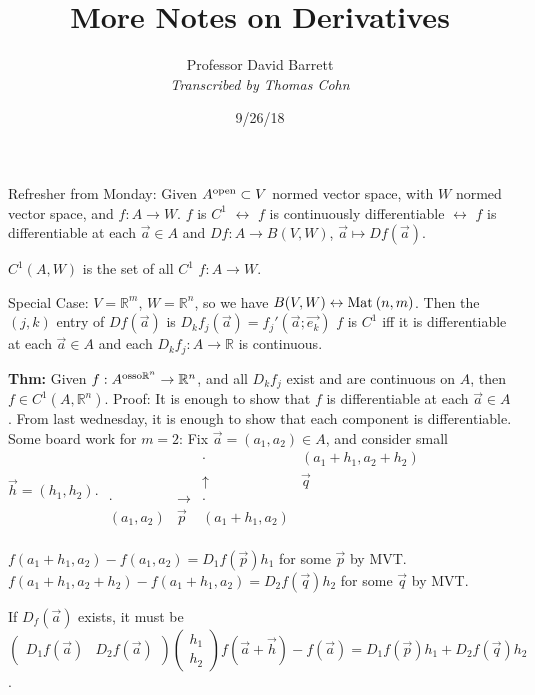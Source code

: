 \documentclass[10pt,letterpaper]{article}
\author{Professor David Barrett\\ \small\textit{Transcribed by Thomas Cohn}}
\title{More Notes on Derivatives}
\date{9/26/18} %
\newcommand{\n}{\hfill\break}
\newcommand{\thm}[1]{\par\noindent\settowidth{\hangindent}{\textbf{Thm: }}\textbf{Thm: }#1\n}
\newcommand{\ptxt}[1]{\textrm{\textnormal{#1}}}
\newcommand{\reals}{\mathbb{R}}
\newcommand{\R}{\reals}
\newcommand{\Mat}{\ptxt{Mat}\>}
\begin{document}
\maketitle
\setlength\RaggedRightParindent{\parindent}
\RaggedRight

\par\noindent Refresher from Monday: Given $A^{\ptxt{open}}\subset{}V$ normed vector space, with $W$ normed vector space, and $f:A\to{}W$.\n
$f$ is $C^{1}$ $\leftrightarrow$ $f$ is continuously differentiable\n
{} $\leftrightarrow$ $f$ is differentiable at each $\vec{a}\in{}A$ and $Df:A\to{}B(V,W)$, $\vec{a}\mapsto{}Df(\vec{a})$.\n

\par\noindent $C^{1}(A,W)$ is the set of all $C^{1}$ $f:A\to{}W$.\n

\par\noindent Special Case: $V=\R^{m}$, $W=\R^{n}$, so we have $B(V,W)\leftrightarrow{}\Mat(n,m)$.\n
Then the $(j,k)$ entry of $Df(\vec{a})$ is $D_{k}f_{j}(\vec{a})=f_{j}'(\vec{a};\vec{e_{k}})$\n
$f$ is $C^{1}$ iff it is differentiable at each $\vec{a}\in{}A$ and each $D_{k}f_{j}:A\to\R$ is continuous.\n

\thm{Given $f:A^{\ptxt{osso}\R^{n}}\to\R^{n}$, and all $D_{k}f_{j}$ exist and are continuous on $A$, then $f\in{}C^{1}(A,\R^{n})$.\n
Proof: It is enough to show that $f$ is differentiable at each $\vec{a}\in{}A$. From last wednesday, it is enough to show that each component is differentiable.\n
\n
Some board work for $m=2$:\n
Fix $\vec{a}=(a_{1},a_{2})\in{}A$, and consider small $\vec{h}=(h_{1},h_{2})$.\n
$\displaystyle\begin{array}{ccrl}
 & & \cdot & (a_{1}+h_{1},a_{2}+h_{2})\\
 & & \uparrow & \vec{q}\\
 \cdot & \rightarrow & \cdot & \\
 (a_{1},a_{2}) & \vec{p} & (a_{1}+h_{1},a_{2}) & \\
\end{array}$}\n

\par\noindent $f(a_{1}+h_{1},a_{2})-f(a_{1},a_{2})=D_{1}f(\vec{p})h_{1}$ for some $\vec{p}$ by MVT.\n
$f(a_{1}+h_{1},a_{2}+h_{2})-f(a_{1}+h_{1},a_{2})=D_{2}f(\vec{q})h_{2}$ for some $\vec{q}$ by MVT.\n

\par\noindent If $D_{f}(\vec{a})$ exists, it must be $\left(\begin{array}{cc}D_{1}f(\vec{a}) & D_{2}f(\vec{a})\end{array}\right)\left(\begin{array}{c}h_{1}\\ h_{2}\end{array}\right)f(\vec{a}+\vec{h})-f(\vec{a})=D_{1}f(\vec{p})h_{1}+D_{2}f(\vec{q})h_{2}$.\n
\end{document}

